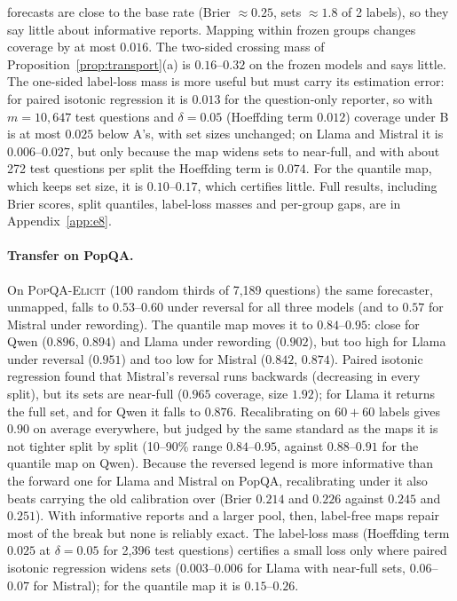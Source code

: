 \documentclass[11pt]{article}
\theoremstyle{definition}
\theoremstyle{remark}
\newcommand{\1}{\mathbf{1}}
\newcommand{\expname}[1]{\textsc{#1}}
\begin{document}
forecasts are close to the base rate (Brier $\approx0.25$, sets $\approx1.8$ of 2 labels), so they say
little about informative reports. Mapping within frozen groups changes coverage by at most $0.016$.
The two-sided crossing mass of Proposition~\ref{prop:transport}(a) is $0.16$--$0.32$ on the frozen models
and says little. The one-sided label-loss mass is more useful but must carry its estimation error: for
paired isotonic regression it is $0.013$ for the question-only reporter, so with $m=10{,}647$ test
questions and $\delta=0.05$ (Hoeffding term $0.012$) coverage under B is at most $0.025$ below A's, with
set sizes unchanged; on Llama and Mistral it is $0.006$--$0.027$, but only because the map widens sets
to near-full, and with about 272 test questions per split the Hoeffding term is $0.074$. For the quantile
map, which keeps set size, it is $0.10$--$0.17$, which certifies little. Full results, including Brier
scores, split quantiles, label-loss masses and per-group gaps, are in Appendix~\ref{app:e8}.

\paragraph{Transfer on PopQA.} On \expname{PopQA-Elicit} (100 random thirds of 7{,}189
questions) the same forecaster, unmapped, falls to $0.53$--$0.60$ under reversal for all three models
(and to $0.57$ for Mistral under rewording). The quantile map moves it to $0.84$--$0.95$: close for Qwen
($0.896$, $0.894$) and Llama under rewording ($0.902$), but too high for Llama under reversal ($0.951$)
and too low for Mistral ($0.842$, $0.874$). Paired isotonic regression found that Mistral's reversal
runs backwards (decreasing in every split), but its sets are near-full ($0.965$ coverage, size $1.92$);
for Llama it returns the full set, and for Qwen it falls to $0.876$. Recalibrating on $60{+}60$ labels gives
$0.90$ on average everywhere, but judged by the same standard as the maps it is not tighter split by split
(10--90\% range $0.84$--$0.95$, against $0.88$--$0.91$ for the quantile map on Qwen). Because the reversed
legend is more informative than the forward one for Llama and Mistral on PopQA, recalibrating under it also
beats carrying the old calibration over (Brier $0.214$ and $0.226$ against $0.245$ and $0.251$). With
informative reports and a larger pool, then, label-free maps repair most of the break but none is
reliably exact. The label-loss mass (Hoeffding term $0.025$ at $\delta=0.05$ for 2{,}396 test questions)
certifies a small loss only where paired isotonic regression widens sets ($0.003$--$0.006$ for Llama with
near-full sets, $0.06$--$0.07$ for Mistral); for the quantile map it is $0.15$--$0.26$.
\end{document}
